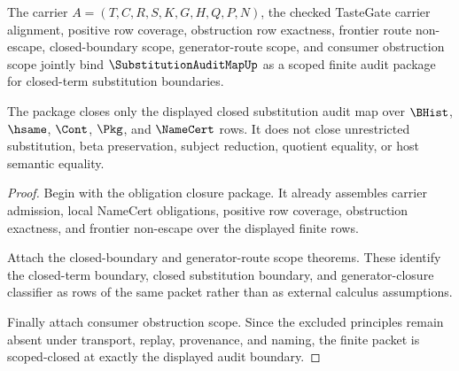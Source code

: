 \begin{theorem}
\label{thm:substitutionauditmap-scoped-closure-package}
The carrier $A=(T,C,R,S,K,G,H,Q,P,N)$, the checked TasteGate carrier alignment, positive row coverage, obstruction row exactness, frontier route non-escape, closed-boundary scope, generator-route scope, and consumer obstruction scope jointly bind $\SubstitutionAuditMapUp$ as a scoped finite audit package for closed-term substitution boundaries.

The package closes only the displayed closed substitution audit map over $\BHist$, $\hsame$, $\Cont$, $\Pkg$, and $\NameCert$ rows. It does not close unrestricted substitution, beta preservation, subject reduction, quotient equality, or host semantic equality.
\end{theorem}
\begin{proof}
Begin with the obligation closure package. It already assembles carrier admission, local NameCert obligations, positive row coverage, obstruction exactness, and frontier non-escape over the displayed finite rows.

Attach the closed-boundary and generator-route scope theorems. These identify the closed-term boundary, closed substitution boundary, and generator-closure classifier as rows of the same packet rather than as external calculus assumptions.

Finally attach consumer obstruction scope. Since the excluded principles remain absent under transport, replay, provenance, and naming, the finite packet is scoped-closed at exactly the displayed audit boundary.
\end{proof}

